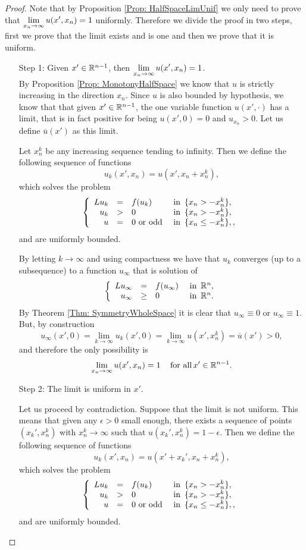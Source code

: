\begin{proof}
Note that by Proposition \ref{Prop: HalfSpaceLimUnif} we only need to prove that $\displaystyle \lim_{x_n\to \infty} u(x',x_n) = 1$ uniformly. Therefore we divide the proof in two steps, first we prove that the limit exists and is one and then we prove that it is uniform.
\begin{enumerate}
\item[Step 1:] Given $x'\in \mathbb{R}^{n-1}$, then  $\displaystyle \lim_{x_n\to \infty} u(x',x_n) = 1$.\\

By Proposition \ref{Prop: MonotonyHalfSpace} we know that $u$ is strictly increasing in the direction $x_n$. Since $u$ is also bounded by hypothesis, we know that that given $x'\in\mathbb{R}^{n-1}$, the one variable function $u(x',\cdot)$ has a limit, that is in fact positive for being $u(x',0) = 0$ and $u_{x_n}>0$. Let us define $\overline{u}(x')$ as this limit.

Let $x_n^k$ be any increasing sequence tending to infinity. Then we define the following sequence of functions
$$ u_k(x',x_n) = u(x',x_n+x_n^k), $$
which solves the problem
\begin{equation}
\left\{\begin{array}{rcll}
Lu_k &=& f(u_k)   &\textrm{ in } \,\{x_n>-x_n^k\},\\
u_k &>& 0   &\textrm{ in } \,\{x_n>-x_n^k\},\\
u &=& 0 \,\, \text{or odd}  &\textrm{ in } \,\{x_n\leq-x_n^k\},,
\end{array} \right.
\end{equation}
and are uniformly bounded.

By letting $k\to\infty$ and using compactness \todo{!!!!} we have that $u_k$ converges (up to a subsequence) to a function $u_\infty$ that is solution of
\begin{equation}
\left\{\begin{array}{rcll}
Lu_\infty &=& f(u_\infty)   &\textrm{ in } \,\mathbb{R}^n,\\
u_\infty &\geq& 0   &\textrm{ in } \,\mathbb{R}^n.
\end{array} \right.
\end{equation}
By Theorem \ref{Thm: SymmetryWholeSpace} it is clear that $u_\infty\equiv 0$ or $u_\infty \equiv 1$. But, by construction
$$ u_\infty(x',0) = \lim_{k\to \infty} u_k(x',0) = \lim_{k\to \infty} u(x',x_n^k) = \overline{u}(x') > 0, $$
and therefore the only possibility is
$$ \lim_{x_n\to \infty} u(x',x_n) = 1 \,\,\,\,\, \text{ for all} \, x'\in\mathbb{R}^{n-1}. $$

\item[Step 2:] The limit is uniform in $x'$.

Let us proceed by contradiction. Suppose that the limit is not uniform. This means that given any $\epsilon>0$ small enough, there exists a sequence of points $(x_k',x_n^k)$ with $x_n^k\to \infty$ such that $u(x_k',x_n^k) = 1-\epsilon$. Then we define the following sequence of functions
$$ u_k(x',x_n) = u(x'+x_k',x_n+x_n^k), $$
which solves the problem
\begin{equation}
\left\{\begin{array}{rcll}
Lu_k &=& f(u_k)   &\textrm{ in } \,\{x_n>-x_n^k\},\\
u_k &>& 0   &\textrm{ in } \,\{x_n>-x_n^k\},\\
u &=& 0 \,\, \text{or odd}  &\textrm{ in } \,\{x_n\leq-x_n^k\},,
\end{array} \right.
\end{equation}
and are uniformly bounded.


\end{enumerate}
\end{proof}
